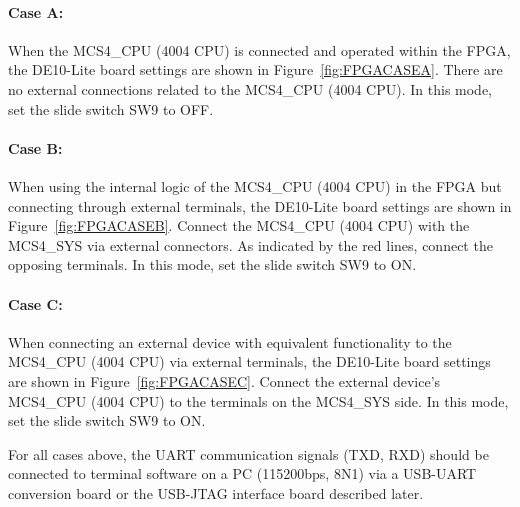 \paragraph{Case A:} When the MCS4\_CPU (4004 CPU) is connected and operated within the FPGA, the DE10-Lite board settings are shown in Figure~\ref{fig:FPGACASEA}. There are no external connections related to the MCS4\_CPU (4004 CPU). In this mode, set the slide switch SW9 to OFF.

\paragraph{Case B:} When using the internal logic of the MCS4\_CPU (4004 CPU) in the FPGA but connecting through external terminals, the DE10-Lite board settings are shown in Figure~\ref{fig:FPGACASEB}. Connect the MCS4\_CPU (4004 CPU) with the MCS4\_SYS via external connectors. As indicated by the red lines, connect the opposing terminals. In this mode, set the slide switch SW9 to ON.

\paragraph{Case C:} When connecting an external device with equivalent functionality to the MCS4\_CPU (4004 CPU) via external terminals, the DE10-Lite board settings are shown in Figure~\ref{fig:FPGACASEC}. Connect the external device's MCS4\_CPU (4004 CPU) to the terminals on the MCS4\_SYS side. In this mode, set the slide switch SW9 to ON.

For all cases above, the UART communication signals (TXD, RXD) should be connected to terminal software on a PC (115200bps, 8N1) via a USB-UART conversion board or the USB-JTAG interface board described later.

